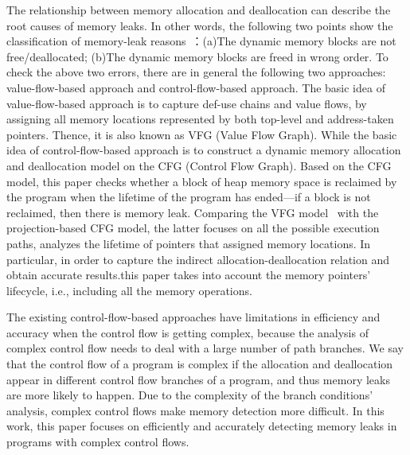 The relationship between memory allocation and deallocation can describe the root causes of memory leaks. In other words, the following two points show the classification of memory-leak reasons~\cite{LCW13}：(a)The dynamic memory blocks are not free/deallocated; (b)The dynamic memory blocks are freed in wrong order.
To check the above two errors, there are in general the following two approaches: value-flow-based approach and control-flow-based approach. The basic idea of value-flow-based approach is to capture def-use chains and value flows, by assigning all memory locations represented by both top-level and address-taken pointers. Thence, it is also known as VFG (Value Flow Graph). While the basic idea of control-flow-based approach is to construct a dynamic memory allocation and deallocation model on the CFG (Control Flow Graph). Based on the CFG model, this paper checks whether a block of heap memory space is reclaimed by the program when the lifetime of the program has ended---if a block is not reclaimed, then there is memory leak. Comparing the VFG model~\cite{SYX12} with the projection-based CFG model, the latter focuses on all the possible execution paths, analyzes the lifetime of pointers that assigned memory locations. %
In particular, in order to capture the indirect allocation-deallocation relation and obtain accurate results.this paper takes into account the memory pointers' lifecycle, i.e., including all the memory operations.
 
The existing control-flow-based approaches have limitations in efficiency and accuracy when the control flow is getting complex, because the analysis of complex control flow needs to deal with a large number of path branches. %
We say that the control flow of a program is complex if the allocation and deallocation appear in different control flow branches of a program, and thus memory leaks are more likely to happen. Due to the complexity of the branch conditions' analysis, complex control flows make memory detection more difficult. %
In this work, this paper focuses on efficiently and accurately detecting memory leaks in programs with complex control flows.  
 
